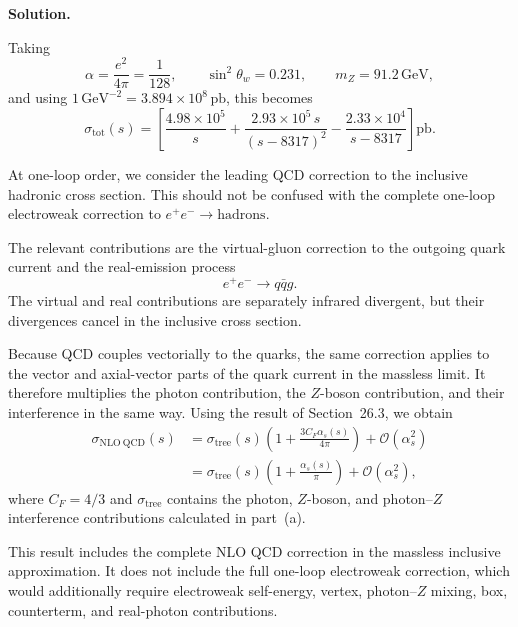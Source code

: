\documentclass[a4paper,11pt]{article}
\newenvironment{solution}{\par\medskip\noindent\textbf{Solution.}\par\smallskip}{\par\medskip}
\begin{document}
\begin{solution}
Taking
\begin{equation}
    \alpha=\frac{e^2}{4\pi}=\frac{1}{128},
    \qquad
    \sin^2\theta_w=0.231,
    \qquad
    m_Z=91.2\,\mathrm{GeV},
\end{equation}
and using $1\,\mathrm{GeV}^{-2}=3.894\times10^8\,\mathrm{pb}$, this becomes
\begin{equation}
\boxed{
    \sigma_{\mathrm{tot}}(s)
    =
    \left[
        \frac{4.98\times10^5}{s}
        +
        \frac{2.93\times10^5\,s}
        {(s-8317)^2}
        -
        \frac{2.33\times10^4}
        {s-8317}
    \right]\mathrm{pb}.
}
\end{equation}

At one-loop order, we consider the leading QCD correction to the
inclusive hadronic cross section. This should not be confused with the
complete one-loop electroweak correction to
$e^+e^-\to\mathrm{hadrons}$.

The relevant contributions are the virtual-gluon correction to the
outgoing quark current and the real-emission process
\begin{equation}
    e^+e^-\to q\bar q g.
\end{equation}
The virtual and real contributions are separately infrared divergent,
but their divergences cancel in the inclusive cross section.

Because QCD couples vectorially to the quarks, the same correction
applies to the vector and axial-vector parts of the quark current in the
massless limit. It therefore multiplies the photon contribution, the
$Z$-boson contribution, and their interference in the same way. Using
the result of Section~26.3, we obtain
\begin{equation}
\begin{aligned}
    \sigma_{\mathrm{NLO\ QCD}}(s)
    &=
    \sigma_{\mathrm{tree}}(s)
    \left(
        1+\frac{3C_F\alpha_s(s)}{4\pi}
    \right)
    +\mathcal O(\alpha_s^2)
    \\
    &=
    \boxed{
    \sigma_{\mathrm{tree}}(s)
    \left(
        1+\frac{\alpha_s(s)}{\pi}
    \right)
    }
    +\mathcal O(\alpha_s^2),
\end{aligned}
\end{equation}
where $C_F=4/3$ and $\sigma_{\mathrm{tree}}$ contains the photon,
$Z$-boson, and photon--$Z$ interference contributions calculated in
part~(a).

This result includes the complete NLO QCD correction in the massless
inclusive approximation. It does not include the full one-loop
electroweak correction, which would additionally require electroweak
self-energy, vertex, photon--$Z$ mixing, box, counterterm, and
real-photon contributions.
\end{solution}
\end{document}
